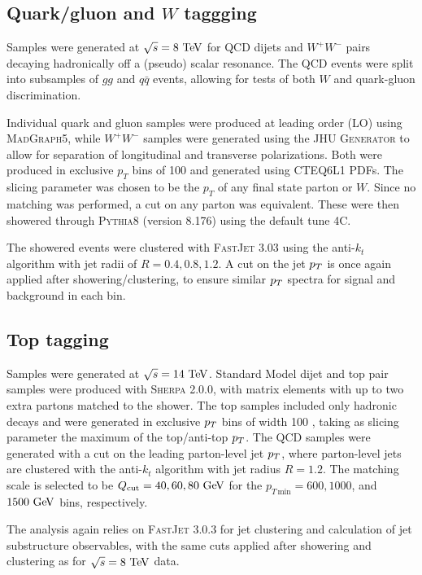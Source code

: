 \subsection{Quark/gluon and $W$ taggging}

Samples were generated at $\sqrt{s} = 8\TeV$ for QCD dijets and $W^+W^-$
pairs decaying hadronically off a (pseudo) scalar resonance. The QCD events
were split into subsamples of $gg$ and $q\bar{q}$ events, allowing for tests
of both $W$ and quark-gluon discrimination. 

Individual quark and gluon samples were produced at leading order (LO)
using \textsc{MadGraph5}, while $W^+W^-$ samples were generated using
the \textsc{JHU Generator} to allow for separation of longitudinal and
transverse polarizations. Both were produced in exclusive $p_T$ bins
of 100 {\GeV} and generated using \textsc{CTEQ6L1} PDFs. The slicing parameter
was chosen to be the $p_T$ of any final state parton or $W$. Since
no matching was performed, a cut on any parton was equivalent. These were
then showered through \textsc{Pythia8} (version 8.176) using the default tune 4C.

The showered events were clustered with \textsc{FastJet} 3.03 using
the anti-$k_t$ algorithm with jet radii of $R = 0.4, 0.8, 1.2$. A cut on
the jet $p_T$ is once again applied after showering/clustering, to ensure
similar $p_T$ spectra for signal and background in each bin.

\subsection{Top tagging}
Samples were generated at $\sqrt{s}=14\TeV$. Standard Model dijet and top pair
samples were produced with \textsc{Sherpa} 2.0.0, with matrix elements with up
to two extra partons matched to the shower. The top samples included only
hadronic decays and  were generated in exclusive $p_T$ bins of width 100 \GeV,
taking as slicing parameter the maximum of the top/anti-top $p_T$. The QCD
samples were generated with a cut on the leading parton-level jet $p_T$, where
parton-level jets are clustered with the anti-$k_t$ algorithm with jet radius
$R=1.2$. The matching scale is selected to be $Q_{\rm cut}=40, 60, 80 \GeV$ for
the $p_{T\,\text{min}}=600, 1000$, and $1500 \GeV$ bins, respectively.
 
The analysis again relies on \textsc{FastJet} 3.0.3 for jet clustering and
calculation of jet substructure observables, with the same cuts applied after
showering and clustering as for $\sqrt{s} = 8\TeV$ data.